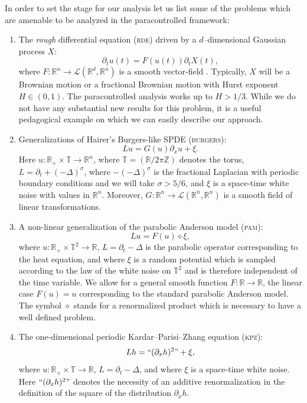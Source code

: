\documentclass[11pt,a4paper]{article}
\theoremstyle{remark}
\newcommand{\R}{\mathbb{R}}
\newcommand{\Z}{\mathbb{Z}}
\newcommand{\Lcal}{\mathcal{L}}
\begin{document}
In order to set the stage for our analysis let us list some of the problems which are amenable to be analyzed in the paracontrolled framework:
\begin{enumerate}%
  \item The \emph{rough} differential equation (\textsc{rde}) driven by a $d$--dimensional Gaussian process $X$: 
  \[
     \partial_t u(t) = F(u(t)) \partial_t X(t),%
  \]
  where $F\colon\R^n \rightarrow \Lcal(\R^d, \R^n)$ is a smooth vector-field . Typically, $X$ will be a Brownian motion or a fractional Brownian motion with Hurst exponent $H\in(0,1)$. The paracontrolled analysis works up to $H>1/3$.  While we do not have any substantial new results for this problem, it is a useful pedagogical example on which we can easily describe our approach.
  
  \item Generalizations of Hairer's Burgers-like SPDE (\textsc{burgers}):
  \[
     L u = G(u) \partial_x u + \xi.
  \]
  Here $u\colon \R_+ \times \mathbb{T} \rightarrow \R^n$, where $\mathbb{T} = (\R/2\pi \Z)$ denotes the torus, $L = \partial_t + (-\Delta)^{\sigma}$, where $-(-\Delta)^\sigma$ is the fractional Laplacian with periodic boundary conditions and we will take $\sigma > 5/6$, and $\xi$ is a space-time white noise with values in $\R^n$. Moreover, $G\colon \R^n \rightarrow \Lcal (\R^n, \R^n)$ is a smooth field of linear transformations.
  
  \item A non-linear generalization of the parabolic Anderson model (\textsc{pam}):
  \[
     L u = F(u) \diamond \xi,
  \]
  where $u \colon \R_+ \times \mathbb{T}^2 \rightarrow \R$, $L = \partial_t - \Delta$ is the parabolic operator corresponding to the heat equation, and where $\xi$ is a random potential which is sampled according to the law of the white noise on  $\mathbb{T}^2$ and is therefore independent of the time variable. We allow for a general smooth function $F\colon \R \rightarrow \R$, the linear case $F(u)=u$ corresponding to the standard parabolic Anderson model. The symbol $\diamond$ stands for a renormalized product which is necessary to have a well defined problem. 
  
  \item The one-dimensional periodic Kardar--Parisi--Zhang equation (\textsc{kpz}):
  \[
   L h = ``(\partial_x h)^2" + \xi,
  \]
    where $u \colon \R_+ \times \mathbb{T} \rightarrow \R$, $L = \partial_t - \Delta$, and where $\xi$ is a space-time white noise. Here $``(\partial_x h)^2"$ denotes the necessity of an additive renormalization in the definition of the square of the distribution $\partial_x h$.


\end{enumerate}
\end{document}
